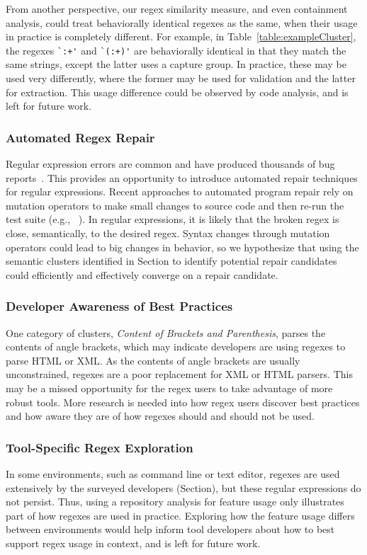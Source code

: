 From another perspective, our regex similarity measure, and even containment analysis, could treat behaviorally identical regexes as the same, when  their usage in practice is completely different. For example, in Table~\ref{table:exampleCluster}, the regexes \verb!`:+'! and \verb!`(:+)'! are behaviorally identical in that they match the same strings, except the latter uses a capture group. In practice, these may be used very differently, where the former may be used for validation and the latter for extraction. This usage difference could be observed by code  analysis, and is left for future work.

\vspace{-2pt}
\subsubsection{Automated Regex Repair}
Regular expression errors are common and have produced thousands of bug reports~\cite{Spishak:2012:TSR:2318202.2318207}. This provides an opportunity to introduce automated repair techniques for regular expressions.
Recent approaches to automated program repair rely on mutation operators to make small changes to source code and then re-run the test suite (e.g., ~\cite{cacm10, genprog-tse-journal}). In regular expressions, it is likely that the broken regex is close, semantically, to the desired regex. Syntax changes through mutation operators could lead to big changes in behavior, so we hypothesize that using the semantic clusters identified in Section to identify potential repair candidates could efficiently and effectively converge on a repair candidate.

\subsubsection{Developer Awareness of Best Practices}
One category of clusters, \emph{Content of Brackets and Parenthesis}, parses the contents of angle brackets, which may indicate developers are using regexes to parse HTML or XML.  As the contents of angle brackets are usually unconstrained, regexes are a poor replacement for XML or HTML parsers.  This may be a missed opportunity for the regex users to take advantage of more robust tools. More research is needed into how regex users discover best practices and how aware they are of how regexes should and should not be used.

\subsubsection{Tool-Specific Regex Exploration}
In some environments, such as command line or text editor, regexes are used extensively by the surveyed developers (Section), but these regular expressions do not persist. Thus, using a repository analysis for feature usage only illustrates part of how regexes are used in practice. Exploring how the feature usage differs between environments would help inform tool developers about how to best support regex usage in context, and is left for future work.

